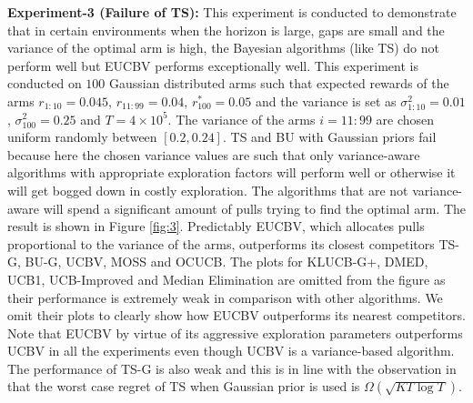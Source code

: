 \textbf{Experiment-3 (Failure of TS):} This experiment is conducted to demonstrate that in certain environments when the horizon is large, gaps are small and the variance of the optimal arm is high, the Bayesian algorithms (like TS) do not perform well but EUCBV performs exceptionally well. This experiment is conducted on $100$ Gaussian distributed arms such that expected rewards of the arms $r_{1:10}=0.045$, $r_{11:99}=0.04$, $r^{*}_{100}=0.05$ and the variance is set as $\sigma_{1:10}^{2}=0.01$,   $\sigma_{100}^{2}=0.25$ and $T=4\times 10^5$. The variance of the arms $i=11:99$ are chosen uniform randomly between $[0.2,0.24]$. TS and BU with Gaussian priors fail because here the chosen variance values are such that only variance-aware algorithms with appropriate exploration factors will perform  well or otherwise it will get bogged down in costly exploration. The algorithms that are not variance-aware will spend a significant amount of pulls trying to find the optimal arm. The result is shown in Figure \ref{fig:3}. Predictably EUCBV, which allocates pulls proportional to the variance of the arms, outperforms its closest competitors TS-G, BU-G, UCBV, MOSS and OCUCB. The plots for KLUCB-G+, DMED, UCB1, UCB-Improved and Median Elimination are omitted from the figure as their performance is extremely weak in comparison with other algorithms. We omit their plots to clearly show how EUCBV outperforms its nearest competitors. Note that EUCBV by virtue of its aggressive exploration parameters outperforms UCBV in all the experiments even though UCBV is a variance-based algorithm. The performance of TS-G is also weak and this is in line with the observation in \citet{lattimore2015optimally} that the worst case regret of TS when Gaussian prior is used is $\Omega\left( \sqrt{KT\log T}\right)$.



